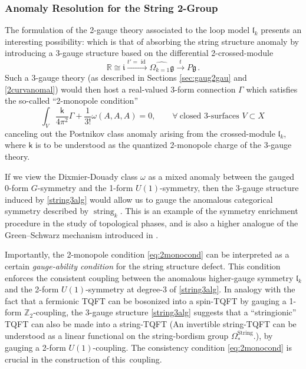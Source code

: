 \documentclass[onecolumn]{article}
\theoremstyle{theorem}
\theoremstyle{remark}
\theoremstyle{example}
\theoremstyle{definition}
\numberwithin{equation}{section}
\begin{document}
\subsubsection{Anomaly Resolution for the String 2-Group}\label{string2resolve}
The formulation of the 2-gauge theory associated to the loop model $\mathfrak{l}_k$ presents an interesting possibility: which is that of absorbing the string structure anomaly by introducing a 3-gauge structure based on the differential 2-crossed-module
\begin{equation}
\mathbb{R}\cong\mathfrak{i}\xrightarrow{t'=\operatorname{id}}\widehat{\Omega_{k=1}\mathfrak{g}}\xrightarrow{t}P\mathfrak{g}\,.\label{string3alg}
\end{equation}
{Such} a 3-gauge theory (as described in Sections \ref{sec:gaug2gau} and \ref{2curvanomal}) would then host a real-valued 3-form connection $\Gamma$ which satisfies the so-called ``2-monopole condition''
\begin{equation}
    \int_V \frac{\mathsf{k}}{4\pi^2}\Gamma + \frac{1}{3!}\omega(A,A,A)=0,\qquad \forall ~\text{closed 3-surfaces }V\subset X\, \label{eq:2monocond}
\end{equation}
canceling out the Postnikov class anomaly arising from the crossed-module $\mathfrak{l}_k$, where $\mathsf{k}$ is to be understood as the quantized 2-monopole charge of the 3-gauge theory. 

If we view the Dixmier-Douady class $\omega$ as a mixed anomaly between the gauged 0-form $G$-symmetry and the 1-form $U(1)$-symmetry, then the 3-gauge structure induced by \eqref{string3alg} would allow us to gauge the anomalous categorical symmetry described by $\operatorname{string}_k$. This is an example of the {{symmetry enrichment}} procedure in the study of topological phases, and is also a higher analogue of the Green--Schwarz mechanism introduced in \cite{Benini_2019,Cordova:2018cvg}.



Importantly, the  2-monopole condition \eqref{eq:2monocond} can be interpreted as a certain \textit{{gauge-ability condition}} for the string structure defect. This condition enforces the consistent coupling between the anomalous higher-gauge symmetry $\mathfrak{l}_k$ and the 2-form $U(1)$-symmetry at degree-3 of \eqref{string3alg}. In analogy with the fact that a fermionic TQFT can be bosonized into a spin-TQFT \cite{Gaiotto:2015zta} by gauging a 1-form $\mathbb{Z}_2$-coupling, the 3-gauge structure \eqref{string3alg} suggests that a ``stringionic'' TQFT can also be made into a string-TQFT \cite{Debray:2023rlx} {(An invertible string-TQFT can be understood as a linear functional on the string-bordism group $\Omega^\text{String}_\ast$.)}, by gauging a 2-form $U(1)$-coupling. The consistency condition \eqref{eq:2monocond} is crucial in the construction of this~coupling.
\end{document}
